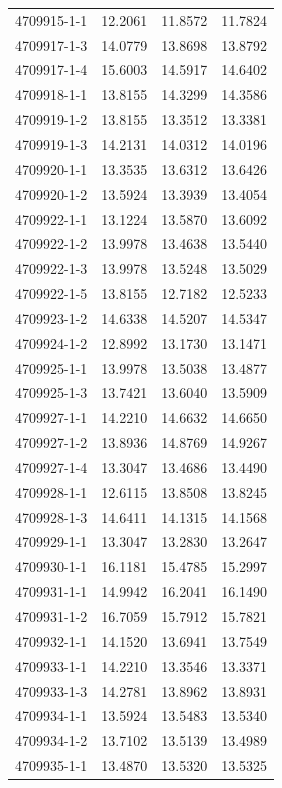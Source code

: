 \begin{longtable}{lrrr}
4709915-1-1 & 12.2061 & 11.8572 & 11.7824 \\
4709917-1-3 & 14.0779 & 13.8698 & 13.8792 \\
4709917-1-4 & 15.6003 & 14.5917 & 14.6402 \\
4709918-1-1 & 13.8155 & 14.3299 & 14.3586 \\
4709919-1-2 & 13.8155 & 13.3512 & 13.3381 \\
4709919-1-3 & 14.2131 & 14.0312 & 14.0196 \\
4709920-1-1 & 13.3535 & 13.6312 & 13.6426 \\
4709920-1-2 & 13.5924 & 13.3939 & 13.4054 \\
4709922-1-1 & 13.1224 & 13.5870 & 13.6092 \\
4709922-1-2 & 13.9978 & 13.4638 & 13.5440 \\
4709922-1-3 & 13.9978 & 13.5248 & 13.5029 \\
4709922-1-5 & 13.8155 & 12.7182 & 12.5233 \\
4709923-1-2 & 14.6338 & 14.5207 & 14.5347 \\
4709924-1-2 & 12.8992 & 13.1730 & 13.1471 \\
4709925-1-1 & 13.9978 & 13.5038 & 13.4877 \\
4709925-1-3 & 13.7421 & 13.6040 & 13.5909 \\
4709927-1-1 & 14.2210 & 14.6632 & 14.6650 \\
4709927-1-2 & 13.8936 & 14.8769 & 14.9267 \\
4709927-1-4 & 13.3047 & 13.4686 & 13.4490 \\
4709928-1-1 & 12.6115 & 13.8508 & 13.8245 \\
4709928-1-3 & 14.6411 & 14.1315 & 14.1568 \\
4709929-1-1 & 13.3047 & 13.2830 & 13.2647 \\
4709930-1-1 & 16.1181 & 15.4785 & 15.2997 \\
4709931-1-1 & 14.9942 & 16.2041 & 16.1490 \\
4709931-1-2 & 16.7059 & 15.7912 & 15.7821 \\
4709932-1-1 & 14.1520 & 13.6941 & 13.7549 \\
4709933-1-1 & 14.2210 & 13.3546 & 13.3371 \\
4709933-1-3 & 14.2781 & 13.8962 & 13.8931 \\
4709934-1-1 & 13.5924 & 13.5483 & 13.5340 \\
4709934-1-2 & 13.7102 & 13.5139 & 13.4989 \\
4709935-1-1 & 13.4870 & 13.5320 & 13.5325 \\

\end{longtable}
